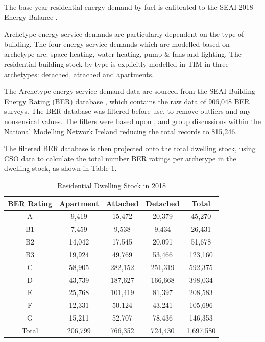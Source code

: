 \documentclass[gmd,manuscript]{copernicus}
\begin{document}
The base-year residential energy demand by fuel is calibrated to the SEAI 2018 Energy Balance \citep{SEAI2019}.

Archetype energy service demands are particularly dependent on the type of building. The four energy service demands which are modelled based on archetype are: space heating, water heating, pump \& fans and lighting. The residential building stock by type is explicitly modelled in TIM in three archetypes: detached, attached and apartments. 

The Archetype energy service demand data are sourced from the SEAI Building Energy Rating (BER) database \citep{SustainableEnergyAuthorityofIreland}, which contains the raw data of 906,048 BER surveys. The BER database was filtered before use, to remove outliers and any nonsensical values. The filters were based upon \citet{Dineen2015}, \citet{Uidhir2020a} and group discussions within the National Modelling Network Ireland reducing the total records to 815,246.

The filtered BER database is then projected onto the total dwelling stock, using CSO data \citep{CSO2020E1008, CSO2020E1055} to calculate the total number BER ratings per archetype in the dwelling stock, as shown in Table \ref{Residential Dwelling Stock}. 

\begin{table}[ht]
 \centering
 \footnotesize
 \caption{Residential Dwelling Stock in 2018}
 \begin{tabular}{ccccc}
 \hline 
 BER Rating & Apartment & Attached & Detached & Total \\ 
 \hline
 A & 9,419 &	15,472 &	20,379 &	45,270 \\
 B1 & 7,459 &	9,538 &	9,434 &	26,431 \\
 B2	& 14,042 &	17,545 &	20,091 &	51,678 \\
 B3 & 19,924 &	49,769 &	53,466 &	123,160 \\
 C & 58,905	& 282,152 &	251,319	& 592,375 \\
 D & 43,739 &	187,627 &	166,668	& 398,034 \\
 E & 25,768 &	101,419 & 	81,397 & 	208,583 \\
 F & 12,331 &	50,124 &	43,241 &	105,696 \\
 G & 15,211 &	52,707 &	78,436 &	146,353 \\
 Total & 206,799 &	766,352	& 724,430 &	1,697,580 \\ \hline 
 \end{tabular}
 \label{Residential Dwelling Stock}
\end{table}
\end{document}
